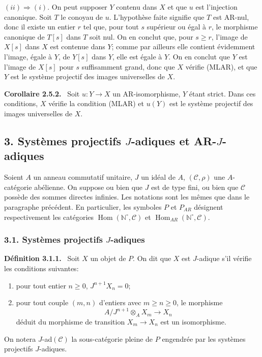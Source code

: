 \documentclass[11pt]{article}
\providecommand{\NN}{\mathbb{N}}
\newenvironment{statement}[1]{\par\medskip\noindent\textbf{#1.}\ }{\par\medskip}
\DeclareMathOperator{\Hom}{Hom}
\providecommand{\Hom}{\operatorname{Hom}}
\providecommand{\NN}{\mathbb N}
\providecommand{\cC}{\mathcal C}
\providecommand{\cC}{\mathcal C}
\providecommand{\Hom}{\operatorname{Hom}}
\begin{document}
$(ii)\Rightarrow(i)$. On peut supposer $Y$ contenu dans $X$ et que $u$ est l'injection canonique. Soit $T$ le conoyau de $u$. L'hypothèse faite signifie que $T$ est AR-nul, donc il existe un entier $r$ tel que, pour tout $s$ supérieur ou égal à $r$, le morphisme canonique de $T[s]$ dans $T$ soit nul. On en conclut que, pour $s\ge r$, l'image de $X[s]$ dans $X$ est contenue dans $Y$; comme par ailleurs elle contient évidemment l'image, égale à $Y$, de $Y[s]$ dans $Y$, elle est égale à $Y$. On en conclut que $Y$ est l'image de $X[s]$ pour $s$ suffisamment grand, donc que $X$ vérifie (MLAR), et que $Y$ est le
système projectif des images universelles de $X$.

\begin{statement}{Corollaire 2.5.2}
Soit $u:Y\to X$ un AR-isomorphisme, $Y$ étant strict. Dans ces conditions, $X$ vérifie la condition (MLAR) et $u(Y)$ est le système projectif des images universelles de $X$.
\end{statement}

\subsection*{3. Systèmes projectifs $J$-adiques et AR-$J$-adiques}
Soient $A$ un anneau commutatif unitaire, $J$ un idéal de $A$, $(\cC,\rho)$ une $A$-catégorie abélienne. On suppose ou bien que $J$ est de type fini, ou bien que $\cC$ possède des sommes directes infinies. Les notations sont les mêmes que dans le paragraphe précédent. En particulier, les symboles $P$ et $P_{AR}$ désignent respectivement les catégories $\Hom(\NN^\circ,\cC)$ et $\Hom_{AR}(\NN^\circ,\cC)$.

\subsubsection*{3.1. Systèmes projectifs $J$-adiques}
\begin{statement}{Définition 3.1.1}
Soit $X$ un objet de $P$. On dit que $X$ est $J$-adique s'il vérifie les conditions suivantes:
\begin{enumerate}[label=(\roman*)]
\item pour tout entier $n\ge0$, $J^{n+1}X_n=0$;
\item pour tout couple $(m,n)$ d'entiers avec $m\ge n\ge0$, le morphisme
\[
A/J^{n+1}\otimes_A X_m\longrightarrow X_n
\]
déduit du morphisme de transition $X_m\to X_n$ est un isomorphisme.
\end{enumerate}
\end{statement}
On notera $J$-ad$(\cC)$ la sous-catégorie pleine de $P$ engendrée par les systèmes projectifs $J$-adiques.
\end{document}
